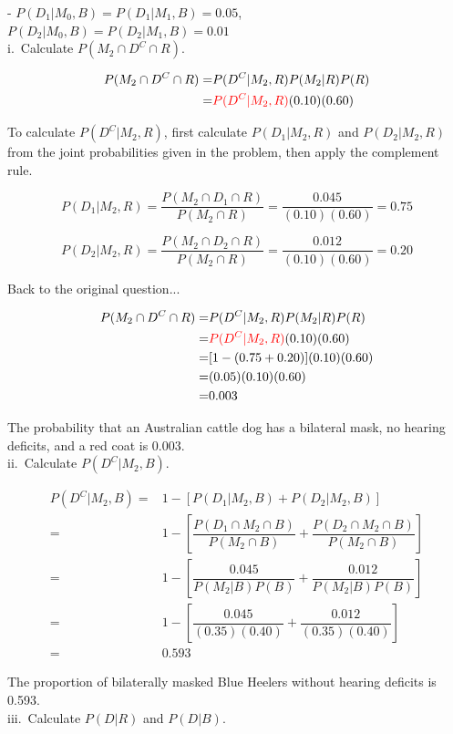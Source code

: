 {	- $P(D_1| M_0, B) = P(D_1| M_1, B) = 0.05$, $P(D_2 | M_0, B) = P(D_2 | M_1, B) = 0.01$ \\
	i.~Calculate $P(M_2 \cap D^C \cap R)$.

	\begin{align*}
	P(M_2 \cap D^C \cap R) =& P(D^C|M_2, R)P(M_2|R)P(R) \\
	=& \textcolor{red}{P(D^C|M_2, R)}(0.10)(0.60) \\
	\end{align*}

	To calculate $P(D^C|M_2, R)$, first calculate $P(D_1|M_2, R)$ and $P(D_2|M_2, R)$ from the joint probabilities given in the problem, then apply the complement rule.

	\[P(D_1|M_2, R) = \dfrac{P(M_2 \cap D_1 \cap R)}{P(M_2 \cap R)} = \dfrac{0.045}{(0.10)(0.60)} = 0.75\]

	\[P(D_2|M_2, R) = \dfrac{P(M_2 \cap D_2 \cap R)}{P(M_2 \cap R)} = \dfrac{0.012}{(0.10)(0.60)} = 0.20\]

	Back to the original question...

	\begin{align*}
	P(M_2 \cap D^C \cap R) =& P(D^C|M_2, R)P(M_2|R)P(R) \\
	=& \textcolor{red}{P(D^C|M_2, R)}(0.10)(0.60) \\
	=& [1 - (0.75 + 0.20)](0.10)(0.60) \\
	=& (0.05)(0.10)(0.60) \\
	=& 0.003
	\end{align*}

	The probability that an Australian cattle dog has a bilateral mask, no hearing deficits, and a red coat is 0.003. \\
	ii.~Calculate $P(D^C|M_2, B)$.

	\begin{align*}
	P(D^C|M_2, B) =& 1 - [P(D_1|M_2, B) + P(D_2|M_2, B)] \\
	=& 1 - \left[ \dfrac{P(D_1 \cap M_2 \cap B)}{P(M_2 \cap B)} + \dfrac{P(D_2 \cap M_2 \cap B)}{P(M_2 \cap B)} \right] \\
	=& 1 - \left[ \dfrac{0.045}{P(M_2|B)P(B)} + \dfrac{0.012}{P(M_2|B)P(B)} \right] \\
	=& 1 - \left[ \dfrac{0.045}{(0.35)(0.40)} + \dfrac{0.012}{(0.35)(0.40)} \right] \\
	=& 0.593
	\end{align*}

	The proportion of bilaterally masked Blue Heelers without hearing deficits is 0.593. \\
	iii.~Calculate $P(D|R)$ and $P(D|B)$.

}
